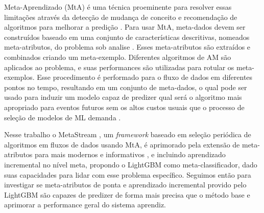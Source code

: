 Meta-Aprendizado (MtA) é uma técnica proeminente para resolver essas limitações através da detecção de mudança de conceito e recomendação de algoritmos para melhorar a predição \cite{Anderson2019,VanRijn2016,Zarmehri2015}.
Para usar MtA, meta-dados devem ser construídos \cite{Vanschoren2018} baseado em uma conjunto de características descritivas, nomeados meta-atributos, do problema sob analise \cite{Rivolli2018}.
Esses meta-atributos são extraídos e combinados criando um meta-exemplo.
Diferentes algoritmos de AM são aplicados ao problema, e suas performances são utilizadas para rotular os meta-exemplos.
Esse procedimento é performado para o fluxo de dados em diferentes pontos no tempo, resultando em um conjunto de meta-dados, o qual pode ser usado para induzir um modelo capaz de predizer qual será o algoritmo mais apropriado para eventos futuros sem os altos custos usuais que o processo de seleção de modelos de ML demanda \cite{Munoz2018}.

Nesse trabalho o MetaStream \cite{rossi2012, rossi2014metastream}, um \textit{framework} baseado em seleção periódica de algoritmos em fluxos de dados usando MtA, é aprimorado pela extensão de meta-atributos para mais modernos e informativos \cite{Rivolli2018},
e incluindo aprendizado incremental no nível meta, propondo o  LightGBM \cite{ke2017lightgbm} como meta-classificador,
dado suas capacidades para lidar com esse problema específico.
Seguimos então para investigar se meta-atributos de ponta e aprendizado incremental provido pelo LightGBM são capazes de predizer de forma mais precisa que o método base e aprimorar a performance geral do sistema aprendiz.